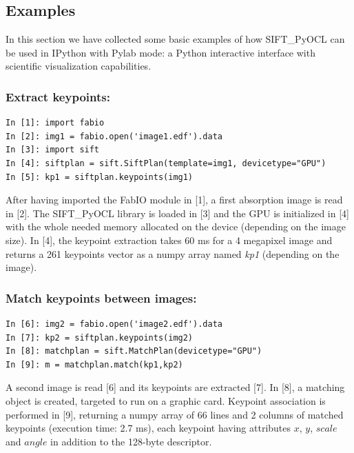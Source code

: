 \documentclass[preprint]{iucr}
\begin{document}
\subsection{Examples}

In this section we have collected some basic examples of how
SIFT\_PyOCL can be used in IPython \cite{ipython} with Pylab \cite{matplotlib}
mode: a Python interactive interface with scientific visualization
capabilities.

\subsubsection{Extract keypoints:}
\begin{verbatim}
In [1]: import fabio
In [2]: img1 = fabio.open('image1.edf').data
In [3]: import sift
In [4]: siftplan = sift.SiftPlan(template=img1, devicetype="GPU")
In [5]: kp1 = siftplan.keypoints(img1)
\end{verbatim}

After having imported the FabIO \cite{fabio} module in [1], a first
absorption image is read in [2]. The SIFT\_PyOCL library is loaded in [3] and the
GPU is initialized in [4] with the whole needed memory allocated on the
device (depending on the image size).
In [4], the keypoint extraction takes 60 ms for a
4 megapixel image and returns a 261 keypoints vector as a numpy array named
\emph{kp1} (depending on the image).

\subsubsection{Match keypoints between images:}
\begin{verbatim}
In [6]: img2 = fabio.open('image2.edf').data
In [7]: kp2 = siftplan.keypoints(img2)
In [8]: matchplan = sift.MatchPlan(devicetype="GPU")
In [9]: m = matchplan.match(kp1,kp2)
\end{verbatim}
A second image is read [6] and its keypoints are extracted [7].
In [8], a matching object is created, targeted to run on a graphic card.
Keypoint association is performed in [9], returning a numpy array of 66
lines and 2 columns of matched keypoints (execution time: 2.7 ms), each keypoint having
attributes $x$, $y$, $scale$ and $angle$ in addition to the 128-byte descriptor.
\end{document}
